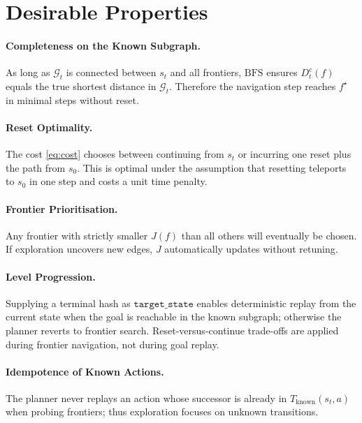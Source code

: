 \documentclass[11pt]{article}
\begin{document}
\section{Desirable Properties}

\paragraph{Completeness on the Known Subgraph.} As long as $\mathcal{G}_t$ is connected between $s_t$ and all frontiers, $\mathrm{BFS}$ ensures $D_t^{c}(f)$ equals the true shortest distance in $\mathcal{G}_t$. Therefore the navigation step reaches $f^\star$ in minimal steps without reset.

\paragraph{Reset Optimality.} The cost \eqref{eq:cost} chooses between continuing from $s_t$ or incurring one reset plus the path from $s_0$. This is optimal under the assumption that resetting teleports to $s_0$ in one step and costs a unit time penalty.

\paragraph{Frontier Prioritisation.} Any frontier with strictly smaller $J(f)$ than all others will eventually be chosen. If exploration uncovers new edges, $J$ automatically updates without retuning.

\paragraph{Level Progression.} Supplying a terminal hash as $\texttt{target\_state}$ enables deterministic replay from the current state when the goal is reachable in the known subgraph; otherwise the planner reverts to frontier search. Reset-versus-continue trade-offs are applied during frontier navigation, not during goal replay.

\paragraph{Idempotence of Known Actions.} The planner never replays an action whose successor is already in $T_{\mathrm{known}}(s_t, a)$ when probing frontiers; thus exploration focuses on unknown transitions.
\end{document}
